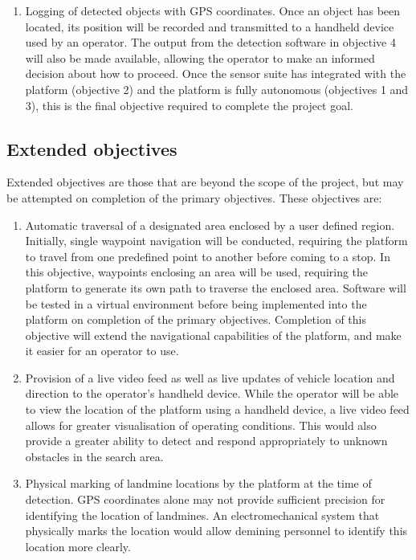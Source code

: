 \documentclass[main.tex]{subfiles}
\begin{document}
\begin{enumerate}
\item Logging of detected objects with GPS coordinates. Once an object has been located, its position will be recorded and transmitted to a handheld device used by an operator. The output from the detection software in objective 4 will also be made available, allowing the operator to make an informed decision about how to proceed. Once the sensor suite has integrated with the platform (objective 2) and the platform is fully autonomous (objectives 1 and 3), this is the final objective required to complete the project goal.
\end{enumerate}

\subsection{Extended objectives}
Extended objectives are those that are beyond the scope of the project, but may be attempted on completion of the primary objectives. These objectives are:

\begin{enumerate}
\item Automatic traversal of a designated area enclosed by a user defined region. Initially, single waypoint navigation will be conducted, requiring the platform to travel from one predefined point to another before coming to a stop. In this objective, waypoints enclosing an area will be used, requiring the platform to generate its own path to traverse the enclosed area. Software will be tested in a virtual environment before being implemented into the platform on completion of the primary objectives. Completion of this objective will extend the navigational capabilities of the platform, and make it easier for an operator to use. 

\item Provision of a live video feed as well as live updates of vehicle location and direction to the operator's handheld device. While the operator will be able to view the location of the platform using a handheld device, a live video feed allows for greater visualisation of operating conditions. This would also provide a greater ability to detect and respond appropriately to unknown obstacles in the search area.

\item Physical marking of landmine locations by the platform at the time of detection. GPS coordinates alone may not provide sufficient precision for identifying the location of landmines. An electromechanical system that physically marks the location would allow demining personnel to identify this location more clearly.
\end{enumerate}
\end{document}
